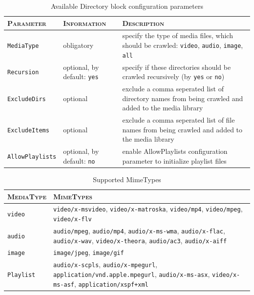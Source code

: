 \documentclass[a4paper,oneside,10pt]{report}
\begin{document}
\begin{table}
	\centering
	\begin{tabular}{|p{7em}|p{6em}|p{18em}|}
		\hline
		\textsc{Parameter} & \textsc{Information} & \textsc{Description}\\
		\hline
		\hline
		\verb|MediaType| & obligatory & specify the type of media files, which should be crawled: \verb|video|, \verb|audio|, \verb|image|, \verb|all| \\
		\hline
		\verb|Recursion| & optional, by default: \verb|yes| & specify if these directories should be crawled recursively (by \verb|yes| or \verb|no|) \\
		\hline
		\verb|ExcludeDirs| & optional & exclude a comma seperated list of directory names from being crawled and added to the media library \\
		\hline
		\verb|ExcludeItems| & optional & exclude a comma seperated list of file names from being crawled and added to the media library \\
		\hline
		\verb|AllowPlaylists| & optional, by default: \verb|no|& enable AllowPlaylists configuration parameter to initialize playlist files \\
		\hline
	\end{tabular}
	\caption{Available Directory block configuration parameters}
	\label{tab:AvailableDirectoryParams}
\end{table}

\begin{table}
	\centering
	\begin{tabular}{|p{7em}|p{25em}|}
		\hline
		\textsc{MediaType} & \textsc{MimeTypes}\\
		\hline
		\hline
		\verb|video| & \verb|video/x-msvideo|, \verb|video/x-matroska|, \verb|video/mp4|, \verb|video/mpeg|, \verb|video/x-flv| \\
		\hline
		\verb|audio| & \verb|audio/mpeg|, \verb|audio/mp4|, \verb|audio/x-ms-wma|, \verb|audio/x-flac|, \verb|audio/x-wav|, \verb|video/x-theora|, \verb|audio/ac3|, \verb|audio/x-aiff| \\
		\hline
		\verb|image| & \verb|image/jpeg|, \verb|image/gif| \\
		\hline
		\verb|Playlist| & \verb|audio/x-scpls|, \verb|audio/x-mpegurl|, \verb|application/vnd.apple.mpegurl|, \verb|audio/x-ms-asx|, \verb|video/x-ms-asf|, \verb|application/xspf+xml| \\
		\hline
	\end{tabular}
	\caption{Supported MimeTypes}
	\label{tab:supportedMediaTypes}
\end{table}
\end{document}
